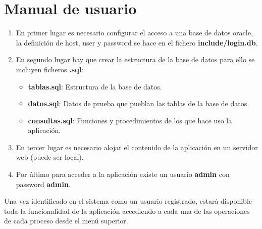 \documentclass[a4paper,12pt]{report}
\begin{document}
\chapter{Manual de usuario}
\label{sec-9}
\begin{enumerate}
\item En primer lugar es necesario configurar el acceso a una base de
datos oracle, la definición de host, user y password se hace en
el fichero \textbf{include/login.db}.
\item En segundo lugar hay que crear la estructura de la base de datos
para ello se incluyen ficheros \textbf{.sql}:
\begin{itemize}
\item \textbf{tablas.sql}: Estructura de la base de datos.
\item \textbf{datos.sql}: Datos de prueba que pueblan las tablas de la base
de datos.
\item \textbf{consultas.sql}: Funciones y procedimientos de los que hace
uso la aplicación.
\end{itemize}
\item En tercer lugar es necesario alojar el contenido de la
aplicación en un servidor web (puede ser local).
\item Por último para acceder a la aplicación existe un usuario
      \textbf{admin} con password \textbf{admin}.
\end{enumerate}


Una vez identificado en el sistema como un usuario registrado,
estará disponible toda la funcionalidad de la aplicación accediendo
a cada una de las operaciones de cada proceso desde el menú superior.
\end{document}

